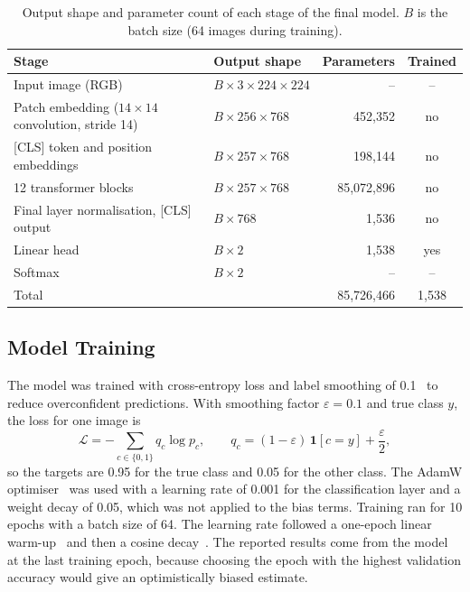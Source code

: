\documentclass[11pt,a4paper]{article}
\begin{document}
\begin{table}[ht]
  \centering
  \small
  \caption{Output shape and parameter count of each stage of the final model. $B$ is the batch size (64 images during training).}
  \label{tab:arch}
  \begin{tabular}{@{}llrc@{}}
    \toprule
    Stage & Output shape & Parameters & Trained \\
    \midrule
    Input image (RGB)                                   & $B \times 3 \times 224 \times 224$ & -- & -- \\
    Patch embedding ($14 \times 14$ convolution, stride 14) & $B \times 256 \times 768$ & 452,352 & no \\
    {[CLS]} token and position embeddings               & $B \times 257 \times 768$ & 198,144 & no \\
    12 transformer blocks                               & $B \times 257 \times 768$ & 85,072,896 & no \\
    Final layer normalisation, [CLS] output             & $B \times 768$ & 1,536 & no \\
    Linear head                                         & $B \times 2$ & 1,538 & yes \\
    Softmax                                             & $B \times 2$ & -- & -- \\
    \midrule
    Total                                               &     & 85,726,466 & 1,538 \\
    \bottomrule
  \end{tabular}
\end{table}

\subsection*{Model Training}

The model was trained with cross-entropy loss and label smoothing of 0.1~\cite{szegedy2016labelsmoothing} to reduce overconfident predictions. With smoothing factor $\varepsilon = 0.1$ and true class $y$, the loss for one image is
\begin{equation}
  \mathcal{L} = -\sum_{c \in \{0,1\}} q_c \log p_c, \qquad
  q_c = (1 - \varepsilon)\,\mathbf{1}[c = y] + \frac{\varepsilon}{2},
  \label{eq:loss}
\end{equation}
so the targets are 0.95 for the true class and 0.05 for the other class. The AdamW optimiser~\cite{loshchilov2019adamw} was used with a learning rate of 0.001 for the classification layer and a weight decay of 0.05, which was not applied to the bias terms. Training ran for 10 epochs with a batch size of 64. The learning rate followed a one-epoch linear warm-up~\cite{goyal2017warmup} and then a cosine decay~\cite{loshchilov2017sgdr}. The reported results come from the model at the last training epoch, because choosing the epoch with the highest validation accuracy would give an optimistically biased estimate.
\end{document}
